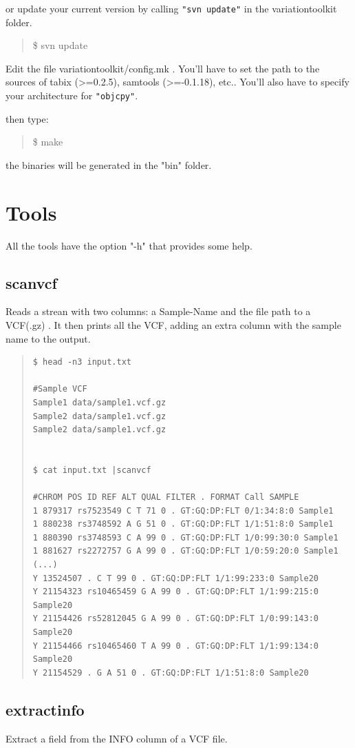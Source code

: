 \documentclass[12pt]{article}
\begin{document}
or update your current version by calling \texttt{"svn update"} in the  variationtoolkit folder.
\begin{quote} 
\$ svn update
\end{quote}

Edit the file variationtoolkit/config.mk . You'll have to set the path to the sources of tabix (>=0.2.5), samtools (>=-0.1.18), etc..
You'll also have to specify your architecture for \texttt{"objcpy"}.

then type:
\begin{quote}
\$ make
\end{quote}
the binaries will be generated in the "bin" folder.


\section{Tools}
All the tools have the option "-h" that provides some help.


\subsection{scanvcf}
Reads a strean with two columns: a Sample-Name and the file path to a VCF(.gz) . It then prints all the VCF, adding an extra column with the sample name to the output.

\begin{quote}
\begin{verbatim}
$ head -n3 input.txt

#Sample	VCF
Sample1	data/sample1.vcf.gz
Sample2	data/sample1.vcf.gz
Sample2	data/sample1.vcf.gz


$ cat input.txt |scanvcf 

#CHROM POS ID REF ALT QUAL FILTER . FORMAT Call SAMPLE
1 879317 rs7523549 C T 71 0 . GT:GQ:DP:FLT 0/1:34:8:0 Sample1
1 880238 rs3748592 A G 51 0 . GT:GQ:DP:FLT 1/1:51:8:0 Sample1
1 880390 rs3748593 C A 99 0 . GT:GQ:DP:FLT 1/0:99:30:0 Sample1
1 881627 rs2272757 G A 99 0 . GT:GQ:DP:FLT 1/0:59:20:0 Sample1
(...)
Y 13524507 . C T 99 0 . GT:GQ:DP:FLT 1/1:99:233:0 Sample20
Y 21154323 rs10465459 G A 99 0 . GT:GQ:DP:FLT 1/1:99:215:0 Sample20
Y 21154426 rs52812045 G A 99 0 . GT:GQ:DP:FLT 1/0:99:143:0 Sample20
Y 21154466 rs10465460 T A 99 0 . GT:GQ:DP:FLT 1/1:99:134:0 Sample20
Y 21154529 . G A 51 0 . GT:GQ:DP:FLT 1/1:51:8:0 Sample20
\end{verbatim}
\end{quote}


\subsection{extractinfo}
Extract a field from the INFO column of a VCF file.
\end{document}
